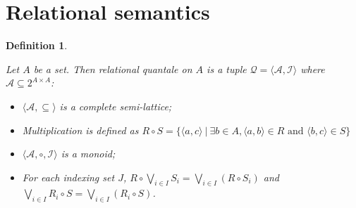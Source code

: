 \documentclass[a4paper]{article}
\theoremstyle{defin}
\newtheorem{defin}{Definition}
\theoremstyle{theorem}
\theoremstyle{prop}
\theoremstyle{lemma}
\theoremstyle{ex}
\theoremstyle{col}
\begin{document}
\begin{comment}
\begin{prooftree}
  \AxiomC{$f : \Gamma \otimes (F_s A \otimes B \otimes F_s A) \otimes \Delta \rightarrow C$}
  \UnaryInfC{$(id_{\Gamma} \otimes {c_A}_{s}^r \otimes id_{\Delta}) \circ f: \Gamma \otimes (B \otimes F_s A) \otimes \Delta \rightarrow C$}
\end{prooftree}

\begin{prooftree}
  \AxiomC{$f : \Gamma \otimes (\Delta \otimes F_s A) \otimes \Theta \rightarrow B$}
  \UnaryInfC{$(id_{\Gamma} \otimes (id_{\Delta} \otimes {e_A}_{s}) \otimes id_{\Theta}) \circ f: \Gamma \otimes (F_s A \otimes \Delta) \otimes \Theta \rightarrow B$}
\end{prooftree}

\begin{prooftree}
  \AxiomC{$f : \Gamma \otimes (F_s A \otimes \Delta) \otimes \Theta \rightarrow B$}
  \UnaryInfC{$(id_{\Gamma} \otimes (id_{\Delta} \otimes {e_A}_{s}^{-1}) \otimes id_{\Theta}) \circ f: \Gamma \otimes (\Delta \otimes F_s A) \otimes \Theta \rightarrow B$}
\end{prooftree}

    \item Completeness:

\begin{defin}
\end{defin}

  \end{itemize}
\end{proof}

\end{comment}

\section{Relational semantics}

\begin{defin}
  $ $

  Let $A$ be a set. Then relational quantale on $A$ is a tuple $\mathcal{Q} = \langle \mathcal{A}, \mathcal{I} \rangle$
  where $\mathcal{A} \subseteq 2^{A \times A}$:

  \begin{itemize}
    \item $\langle \mathcal{A}, \subseteq \rangle$ is a complete semi-lattice;
    \item Multiplication is defined as
      $R \circ S = \{ \langle a, c \rangle \: | \: \exists b \in A, \langle a, b \rangle \in R \text{ and } \langle b, c \rangle \in S\}$
    \item $\langle \mathcal{A}, \circ, \mathcal{I} \rangle$ is a monoid;
    \item For each indexing set $J$, $R \circ \bigvee_{i \in I} S_i = \bigvee_{i \in I} (R \circ S_i)$ and
      $\bigvee_{i \in I} R_i \circ S = \bigvee_{i \in I}(R_i \circ S)$.
  \end{itemize}
\end{defin}
\end{document}
